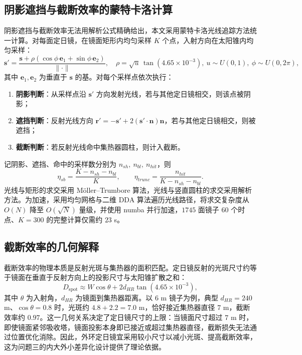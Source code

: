 \documentclass[12pt]{ctexart}
\begin{document}
\subsection{阴影遮挡与截断效率的蒙特卡洛计算}
阴影遮挡与截断效率无法用解析公式精确给出，本文采用蒙特卡洛光线追踪方法统一计算。对每面定日镜，在镜面矩形内均匀采样 $K$ 个点，入射方向在太阳锥内均匀采样：
\begin{equation}
\mathbf{s}'=\frac{\mathbf{s}+\rho(\cos\phi\,\mathbf{e}_1+\sin\phi\,\mathbf{e}_2)}{\|\cdot\|},
\quad \rho=\sqrt{u}\,\tan(4.65\times10^{-3}),\ u\sim U(0,1),\ \phi\sim U(0,2\pi),
\end{equation}
其中 $\mathbf{e}_1,\mathbf{e}_2$ 为垂直于 $\mathbf{s}$ 的基。对每个采样点依次执行：
\begin{enumerate}
\item \textbf{阴影判断}：从采样点沿 $\mathbf{s}'$ 方向发射光线，若与其他定日镜相交，则该点被阴影；
\item \textbf{遮挡判断}：反射光线方向 $\mathbf{r}'=-\mathbf{s}'+2(\mathbf{s}'\cdot\mathbf{n})\mathbf{n}$，若与其他定日镜相交，则被遮挡；
\item \textbf{截断判断}：若反射光线命中集热器圆柱，则计入截断。
\end{enumerate}
记阴影、遮挡、命中的采样数分别为 $n_{sh},\ n_{bl},\ n_{hit}$，则
\begin{equation}
\eta_{sb}=\frac{K-n_{sh}-n_{bl}}{K},
\qquad
\eta_{trunc}=\frac{n_{hit}}{K-n_{sh}-n_{bl}}.
\end{equation}
光线与矩形的求交采用 M\"oller--Trumbore 算法，光线与竖直圆柱的求交采用解析方法。为加速，采用均匀网格与二维 DDA 算法遍历光线路径，将求交复杂度从 $O(N)$ 降至 $O(\sqrt{N})$ 量级，并使用 numba 并行加速，$1745$ 面镜子 $60$ 个时点、$K=300$ 的完整计算仅需约 $23$ s。

\subsection{截断效率的几何解释}
截断效率的物理本质是反射光斑与集热器的面积匹配。定日镜反射的光斑尺寸约等于镜面在垂直于反射方向上的投影尺寸与太阳锥扩散之和：
\begin{equation}
D_{\text{spot}}\approx W\cos\theta + 2d_{HR}\tan(4.65\times10^{-3}),
\end{equation}
其中 $\theta$ 为入射角，$d_{HR}$ 为镜面到集热器距离。以 $6$ m 镜子为例，典型 $d_{HR}=240$ m、$\cos\theta=0.8$ 时，光斑约 $4.8+2.2=7.0$ m，恰好接近集热器直径 $7$ m，截断效率约 $0.97$。这一几何关系决定了定日镜尺寸的上限：当镜面尺寸超过 $7$ m 时，即使镜面紧邻吸收塔，镜面投影本身即已接近或超过集热器直径，截断损失无法通过位置优化消除。因此，外环定日镜宜采用较小尺寸以减小光斑、提高截断效率，这为问题三的内大外小差异化设计提供了理论依据。
\end{document}
